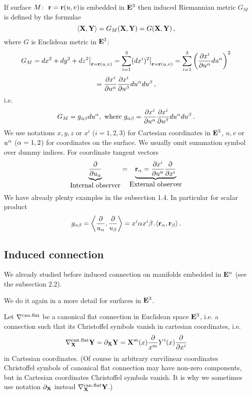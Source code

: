 \documentclass[12pt]{article}
\theoremstyle{theorem}
\numberwithin{equation}{section}
\begin{document}
{  If surface $M\colon\,\, {\bf r}={\bf r}(u,v)$is embedded in ${\bf E}^3$ then induced Riemannian metric
  $G_M$ is defined by the formulae
  \begin{equation}\label{scalarproduct2}
    \langle{\bf X},{\bf Y}\rangle=G_M({\bf X},{\bf Y})=G({\bf X},{\bf Y})\,,
  \end{equation}
  where $G$ is Euclidean metric in ${\bf E}^3$:
           $$
        G_M=dx^2+dy^2+dz^2\big\vert_{{\bf r}={\bf r}(u,v)}=
        \sum_{i=1}^3(dx^i)^2\big\vert_{{\bf r}={\bf r}(u,v)}=\sum_{i=1}^3\left({\partial x^i\over \partial u^\alpha}du^\alpha\right)^2
                $$
                $$=
        {\partial x^i\over \partial u^\alpha} {\partial x^i\over\partial  u^\beta}du^\alpha du^\beta\,,
           $$
        i.e.
            $$
      G_M=g_{\alpha\beta}du^\alpha ,\,\, {\rm where}\,\, g_{\alpha\beta}=
      {\partial x^i\over \partial u^\alpha} {\partial x^i\over \partial u^\beta}du^\alpha du^\beta\,.
           $$
 We use notations $x,y,z$ or $x^i$ ($i=1,2,3$) for Cartesian coordinates in ${\bf E}^3$,
 $u,v$ or $u^\alpha$ ($\alpha=1,2$) for coordinates on the surface. We usually   omit summation symbol
 over  dummy indices.    For coordinate tangent vectors
           $$
 \underbrace{\partial\over \partial u_\alpha}_{\hbox{Internal observer}} =
 \underbrace{{\bf r}_\alpha={\partial x^i\over \partial u^\alpha}{\partial\over \partial x^i}}_{\hbox{External observer}}
           $$
We have already plenty examples in the subsection 1.4. In particular for scalar product
\begin{equation}\label{scalarproduct4}
  g_{\alpha\beta}=\left\langle{\partial\over u_\alpha},{\partial\over u_\beta}\right\rangle=x^i\alpha x^i\beta\,.
  \langle {\bf r}_\alpha,{\bf r}_\beta\rangle\,.
\end{equation}



  \subsection {Induced connection}

  We already studied before induced connection on manifolds embedded in ${\bf E}^n$ (see the subsection 2.2).

  We do it again in a more detail for  surfaces in ${\bf E}^3$.

Let $\nabla^{\rm can.flat}$ be a canonical flat connection in Euclidean space ${\bf E}^3$, i.e. a connection such
that its  Christoffel symbols vanish in cartesian coordinates, i.e.
\begin{equation}\label{canonicalflatconnection}
    \nabla^{\rm can.flat}_{\bf X} {\bf Y}= \partial_{\bf X} {\bf Y}= {\bf X}^m(x){\partial \over x^m}Y^i(x){\partial\over \partial x^i}
\end{equation}
in  Cartesian coordinates. (Of course in arbitrary curvilinear coordinates Christoffel symbols
of canonical flat connection may have non-zero components, but in Cartesian coordinates Christoffel symbols vanish.
It is why we sometimes use notation  $\partial_{\bf X}$ instead $\nabla^{\rm can.flat}_{\bf X} {\bf Y}$.)


}
\end{document}
